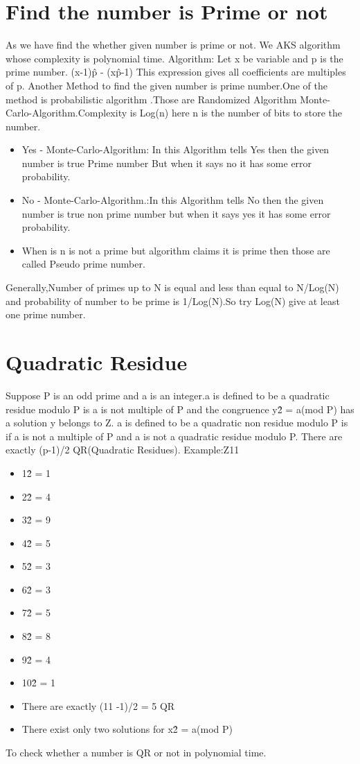 \documentclass[12pt,a4paper]{report}
\begin{document}
\section*{Find the number is Prime or not}
As we have find the whether given number is prime or not.\newline
We AKS algorithm whose complexity is polynomial time.\newline
Algorithm:
Let x be variable and p is the prime number.\newline
(x-1)\^p - (x\^p-1)\newline
This expression gives all coefficients are multiples of p.\newline
Another Method to find the given number is prime number.One of the method is probabilistic algorithm .Those are \newline
Randomized Algorithm Monte-Carlo-Algorithm.Complexity is Log(n) here n is the number of bits to store the number.\newline
\begin{itemize}
\item Yes - Monte-Carlo-Algorithm: In this Algorithm tells Yes then the given number is true Prime number But when it says no it has some error probability.
\item No - Monte-Carlo-Algorithm.:In this Algorithm tells No then the  given number is true non prime number but when it says yes it has some error probability.
\item When is n is not a prime but algorithm claims it is prime then those are called Pseudo prime number.
\end{itemize}
Generally,Number of primes up to N is equal and less than equal to N/Log(N) and probability of number to be prime is 1/Log(N).So try Log(N) give at least one prime number.
\section*{Quadratic Residue}
Suppose P is an odd prime and a is an integer.a is defined to be a quadratic residue modulo P is a is not multiple of P and the congruence y\^2	 = a(mod P) has a solution y belongs to Z. a is defined to be a quadratic non residue modulo P is if a is not a multiple of P and a is not a quadratic residue modulo P.\newline
There are exactly (p-1)/2 QR(Quadratic Residues).\newline
Example:Z11
\begin{itemize}
\item 1\^2 = 1
\item 2\^2 = 4
\item 3\^2 = 9
\item 4\^2 = 5
\item 5\^2 = 3
\item 6\^2 = 3
\item 7\^2 = 5
\item 8\^2 = 8
\item 9\^2 = 4
\item 10\^2 = 1
\item There are exactly (11 -1)/2 = 5 QR
\item There exist only two solutions for x\^2 = a(mod P)
\end{itemize}
To check whether a number is QR or not in polynomial time.
\end{document}
